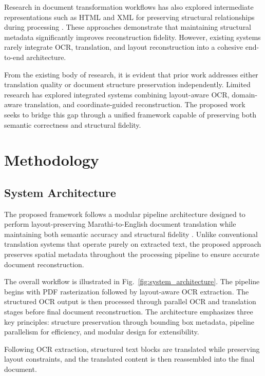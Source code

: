 \documentclass[11pt]{article}
\begin{document}
Research in document transformation workflows has also explored intermediate representations such as HTML and XML for preserving structural relationships during processing \cite{xu_layoutlm:_2020,xu_layoutlmv2:_2022,huang_layoutlmv3:_2022,appalaraju_docformer:_2021}. These approaches demonstrate that maintaining structural metadata significantly improves reconstruction fidelity. However, existing systems rarely integrate OCR, translation, and layout reconstruction into a cohesive end-to-end architecture.

From the existing body of research, it is evident that prior work addresses either translation quality or document structure preservation independently. Limited research has explored integrated systems combining layout-aware OCR, domain-aware translation, and coordinate-guided reconstruction. The proposed work seeks to bridge this gap through a unified framework capable of preserving both semantic correctness and structural fidelity.

\section{Methodology}
\subsection{System Architecture}


The proposed framework follows a modular pipeline architecture designed to perform layout-preserving Marathi-to-English document translation while maintaining both semantic accuracy and structural fidelity \cite{gala_indictrans2:_2023,xu_layoutlm:_2020,xu_layoutlmv2:_2022,huang_layoutlmv3:_2022}. Unlike conventional translation systems that operate purely on extracted text, the proposed approach preserves spatial metadata throughout the processing pipeline to ensure accurate document reconstruction.

The overall workflow is illustrated in Fig.~\ref{fig:system_architecture}. The pipeline begins with PDF rasterization followed by layout-aware OCR extraction. The structured OCR output is then processed through parallel OCR and translation stages before final document reconstruction. The architecture emphasizes three key principles: structure preservation through bounding box metadata, pipeline parallelism for efficiency, and modular design for extensibility.

Following OCR extraction, structured text blocks are translated while preserving layout constraints, and the translated content is then reassembled into the final document.
\end{document}
